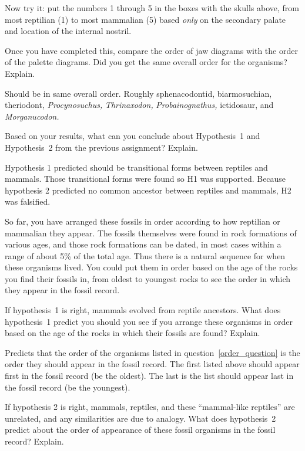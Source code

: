 \documentclass[12pt, hidelinks]{exam}
\newcommand*\AnswerBox[2]{%
    \parbox[t][#1]{0.92\textwidth}{%
    \begin{solution}#2\end{solution}}
}
\begin{document}
\begin{questions}
Now try it: put the numbers 1 through 5 in the boxes with the
skulls above, from most reptilian (1) to most mammalian (5) based \emph{only}
on the secondary palate and location of the internal nostril.

\question\label{order_question}
Once you have completed this, compare the order of jaw diagrams with the order of the palette diagrams. Did you get the same overall order for the organisms? Explain.

\AnswerBox{4\baselineskip}{%
Should be in same overall order. Roughly sphenacodontid, biarmosuchian, theriodont, \textit{Procynosuchus,} \textit{Thrinaxodon,} \textit{Probainognathus,} ictidosaur, and \textit{Morganucodon.}
}

\question
Based on your results, what can you conclude about Hypothesis~1 and Hypothesis~2 from the previous assignment? Explain.

\AnswerBox{4\baselineskip}{%
Hypothesis 1 predicted should be transitional forms between reptiles and mammals. Those transitional forms were found so H1 was supported. Because hypothesis 2 predicted no common ancestor between reptiles and mammals, H2 was falsified.
}

So far, you have arranged these fossils in order according to how reptilian or mammalian they appear.  The fossils themselves were found in rock formations of various ages, and those rock formations can be dated, in most cases within a range of about 5\% of the total age.  Thus there is a natural sequence for when these organisms lived.  You could put them in order based on the age of the rocks you find their fossils in, from oldest to youngest rocks to see the order in which they appear in the fossil record. 

\question
If hypothesis~1 is right, mammals evolved from reptile ancestors.  What does hypothesis~1 predict you should you see if you arrange these organisms in order based on the age of the rocks in which their fossils are found?  Explain.

\AnswerBox{4\baselineskip}{%
	Predicts that the order of the organisms listed in question~\ref{order_question} is the order they should appear in the fossil record. The first listed above should appear first in the fossil record (be the oldest). The last is the list should appear last in the fossil record (be the youngest). 
}

\question
If hypothesis 2 is right, mammals, reptiles, and these ``mammal-like reptiles'' are unrelated, and any similarities are due to analogy.   What does hypothesis~2 predict about the order of appearance of these fossil organisms in the fossil record? Explain. 


\end{questions}
\end{document}

